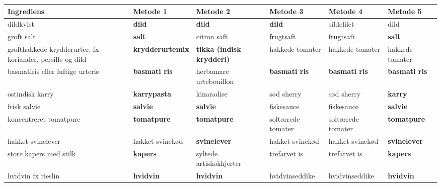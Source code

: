 \begin{table}
    \begin{tabular}{|p{2cm}|p{2cm}|p{2cm}|p{2cm}|p{2cm}|p{2cm}|}
        \hline
        Ingrediens                                                 & Metode 1        & Metode 2                & Metode 3           & Metode 4           & Metode 5        \\ \hline
        dildkvist                                                  & \textbf{dild}            & \textbf{dild}                    & \textbf{dild}               & sildefilet         & dild            \\ \hline
        groft salt                                                 & \textbf{salt}            & citron saft             & frugtsaft          & frugtsaft          & \textbf{salt}            \\ \hline
        grofthakkede krydderurter, fx koriander, persille og dild & \textbf{krydderurtemix}  & \textbf{tikka (indisk krydderi)} & hakkede tomater    & hakkede tomater    & hakkede tomater \\ \hline
        basmatiris eller luftige urteris                           & \textbf{basmati ris}     & herbamare urtebouillon  & \textbf{basmati ris}        & \textbf{basmati ris}        & \textbf{basmati ris}     \\ \hline
        ostindisk karry                                            & \textbf{karrypasta}      & kinaradise              & sød sherry         & sød sherry         & \textbf{karry}           \\ \hline
        frisk salvie                                               & \textbf{salvie}          & \textbf{salvie}                  & fiskesauce         & fiskesauce         & \textbf{salvie}          \\ \hline
        koncentreret tomatpure                                     & \textbf{tomatpure}       & \textbf{tomatpure}               & soltørrede tomater & soltørrede tomater & \textbf{tomatpure}       \\ \hline
        hakket svinelever                                          & hakket svinekød & \textbf{svinelever}              & hakket svinekød    & hakket svinekød    & \textbf{svinelever}      \\ \hline
        store kapers med stilk                                     & \textbf{kapers}          & syltede artiskokhjerter & trefarvet is       & trefarvet is       & \textbf{kapers}          \\ \hline
        hvidvin fx rieslin                                         & \textbf{hvidvin}         & \textbf{hvidvin}                 & hvidvinseddike     & hvidvinseddike     & \textbf{hvidvin}         \\ \hline

\end{tabular}
\end{table}
